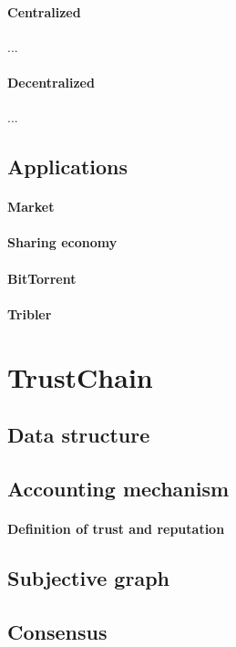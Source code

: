 \paragraph{Centralized} ...

\paragraph{Decentralized} ...

\subsection{Applications}

\paragraph{Market}
\paragraph{Sharing economy}
\paragraph{BitTorrent}
\paragraph{Tribler}

\section{TrustChain}

\subsection{Data structure}
\subsection{Accounting mechanism}
\paragraph{Definition of trust and reputation}
\subsection{Subjective graph}
\subsection{Consensus}

